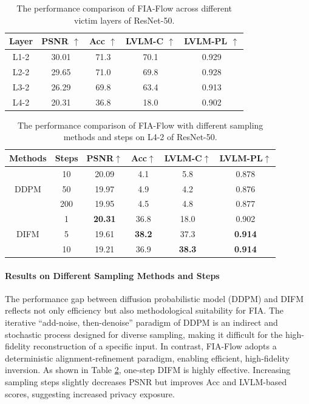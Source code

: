 \begin{table}[t]
\caption{The performance comparison of FIA-Flow across different victim layers of ResNet-50.}
\renewcommand\arraystretch{0.96}
\centering
\label{table-layer}
\begin{tabular}{ccccc}
\toprule
 Layer & PSNR $\uparrow$& Acc $\uparrow$& LVLM-C $\uparrow$& LVLM-PL $\uparrow$\\
  \midrule
 \multirow{1}{*}{L1-2} & 30.01 &71.3 &70.1 &0.929\\
  \multirow{1}{*}{L2-2} & 29.65 & 71.0 &69.8 &0.928\\
   \multirow{1}{*}{L3-2} & 26.29 & 69.8 &63.4 &0.913\\
  \multirow{1}{*}{L4-2} & 20.31  &36.8&18.0 &0.902 \\
 \bottomrule
\end{tabular}
\end{table}

\begin{table}[t]
\caption{The performance comparison of FIA-Flow with different sampling methods and steps on L4-2 of ResNet-50.}
\setlength{\tabcolsep}{1.0mm}
\renewcommand\arraystretch{0.7}
\centering
\label{table-step}
\begin{tabular}{cccccc}
\toprule
 Methods& Steps & PSNR$\uparrow$& Acc$\uparrow$& LVLM-C$\uparrow$& LVLM-PL$\uparrow$\\
\midrule
 \multirow{3}{*}{DDPM} & 10 &20.09 & 4.1& 5.8 &0.878 \\
  &  50 & 19.97&4.9 & 4.2& 0.876 \\
   & 200 &19.95 &4.5 & 4.8 &0.877\\
   \midrule
  \multirow{3}{*}{DIFM} &  1 &\textbf{20.31} &36.8 &18.0 &0.902 \\
  & 5 &19.61 &\textbf{38.2} &37.3 &\textbf{0.914} \\
  & 10 & 19.21&36.9 &\textbf{38.3} &\textbf{0.914} \\
\bottomrule
\end{tabular}
\end{table}





\paragraph{Results on Different Sampling Methods and Steps}
The performance gap between diffusion probabilistic model (DDPM) \cite{ho2020denoising} and DIFM reflects not only efficiency but also methodological suitability for FIA.
The iterative ``add-noise, then-denoise'' paradigm of DDPM is an indirect and stochastic process designed for diverse sampling, making it difficult for the high-fidelity reconstruction of a specific input. 
In contrast, FIA-Flow adopts a deterministic alignment-refinement paradigm, enabling efficient, high-fidelity inversion.
As shown in Table \ref{table-step}, one-step DIFM is highly effective. 
Increasing sampling steps slightly decreases PSNR but improves Acc and LVLM-based scores, suggesting increased privacy exposure.

